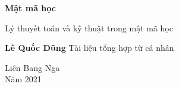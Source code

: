 \begin{titlepage}
	\begin{center}
		\vspace*{1cm}
		
		\Huge
		\textbf{Mật mã học}
		
		\vspace{0.5cm}
		\Large
		Lý thuyết toán và kỹ thuật trong mật mã học
		
		\vspace{1.5cm}
		\textbf{Lê Quốc Dũng}
		\vfill
		Tài liệu tổng hợp từ cá nhân
		
		\vspace{0.8cm}
		\Large
		Liên Bang Nga \\
		Năm 2021
	\end{center}
\end{titlepage}